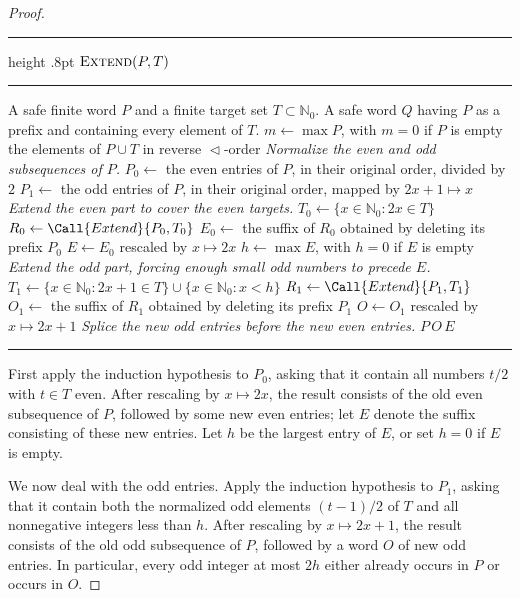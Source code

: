 \documentclass[12pt,reqno]{amsart}
\newcommand{\NN}{\mathbb N}
\newcommand{\bits}{\mathrel{\triangleleft}}
\begin{document}
\begin{proof}
\newpage
\begin{algorithm}[H]
\small
\hrule height .8pt
\kern 3pt
\noindent$\textsc{Extend}(P,T)$\par
\kern 3pt
\hrule
\begin{algorithmic}[1]
\Require A safe finite word $P$ and a finite target set $T\subset\NN_0$.
\Ensure A safe word $Q$ having $P$ as a prefix and containing every element of $T$.
\State $m\gets\max P$, with $m=0$ if $P$ is empty
  \State \Return the elements of $P\cup T$ in reverse $\bits$-order
\EndIf
\Statex \textit{Normalize the even and odd subsequences of $P$.}
\State $P_0\gets$ the even entries of $P$, in their original order, divided by $2$
\State $P_1\gets$ the odd entries of $P$, in their original order, mapped by $2x+1\mapsto x$
\Statex \textit{Extend the even part to cover the even targets.}
\State $T_0\gets\{x\in\NN_0:2x\in T\}$
\State $R_0\gets\Call{Extend}{P_0,T_0}$
\State $E_0\gets$ the suffix of $R_0$ obtained by deleting its prefix $P_0$
\State $E\gets E_0$ rescaled by $x\mapsto2x$
\State $h\gets\max E$, with $h=0$ if $E$ is empty
\Statex \textit{Extend the odd part, forcing enough small odd numbers to precede $E$.}
\State $T_1\gets\{x\in\NN_0:2x+1\in T\}\cup\{x\in\NN_0:x<h\}$
\State $R_1\gets\Call{Extend}{P_1,T_1}$
\State $O_1\gets$ the suffix of $R_1$ obtained by deleting its prefix $P_1$
\State $O\gets O_1$ rescaled by $x\mapsto2x+1$
\Statex \textit{Splice the new odd entries before the new even entries.}
\State \Return $P\,O\,E$
\end{algorithmic}
\hrule
\caption[Safe extension procedure $\textsc{Extend}(P,T)$]{%
The recursive construction used in the proof. The two recursive calls are on
words whose largest entries are strictly smaller than $m$. The extra targets
$x<h$ in the odd call force every odd integer at most $2h$ which is not already
in $P$ to be placed before the new even block $E$; doing this prevents
mixed-parity 4APs from forming.}\label{alg:extend}
\end{algorithm}

First apply the induction hypothesis to $P_0$, asking that it contain all
numbers $t/2$ with $t\in T$ even. After rescaling by $x\mapsto2x$, the result
consists of the old even subsequence of $P$, followed by some new even entries;
let $E$ denote the suffix consisting of these new entries. Let $h$ be the
largest entry of $E$, or set $h=0$ if $E$ is empty.

We now deal with the odd entries. Apply the induction hypothesis to $P_1$,
asking that it contain both the normalized odd elements $(t-1)/2$ of $T$ and all
nonnegative integers less than $h$. After rescaling by $x\mapsto2x+1$, the
result consists of the old odd subsequence of $P$, followed by a word $O$ of new
odd entries. In particular, every odd integer at most $2h$ either already occurs
in $P$ or occurs in $O$.


\end{proof}
\end{document}

